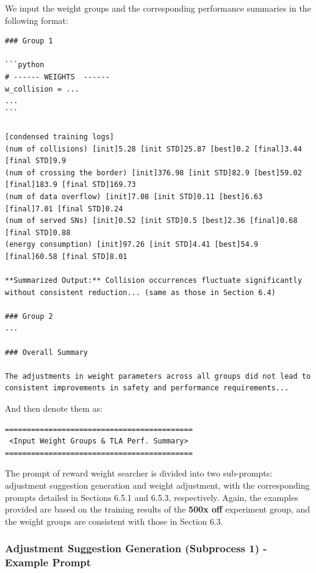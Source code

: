 \documentclass{article}
\begin{document}
We input the weight groups and the corresponding performance summaries in the following format:

\begin{verbatim}
### Group 1

```python
# ------ WEIGHTS  ------
w_collision = ...
...
```

[condensed training logs]
(num of collisions) [init]5.28 [init STD]25.87 [best]0.2 [final]3.44 [final STD]9.9
(num of crossing the border) [init]376.98 [init STD]82.9 [best]59.02 [final]183.9 [final STD]169.73
(num of data overflow) [init]7.08 [init STD]0.11 [best]6.63 [final]7.01 [final STD]0.24
(num of served SNs) [init]0.52 [init STD]0.5 [best]2.36 [final]0.68 [final STD]0.88
(energy consumption) [init]97.26 [init STD]4.41 [best]54.9 [final]60.58 [final STD]8.01

**Summarized Output:** Collision occurrences fluctuate significantly without consistent reduction... (same as those in Section 6.4)

### Group 2
...

### Overall Summary

The adjustments in weight parameters across all groups did not lead to consistent improvements in safety and performance requirements...

\end{verbatim}

And then denote them as:

\begin{verbatim}
===========================================
 <Input Weight Groups & TLA Perf. Summary>
===========================================
\end{verbatim}

The prompt of reward weight searcher is divided into two sub-prompts: adjustment suggestion generation and weight adjustment, with the corresponding prompts detailed in Sections 6.5.1 and 6.5.3, respectively. Again, the examples provided are based on the training results of the \textbf{500x off} experiment group, and the weight groups are consistent with those in Section 6.3.

\subsubsection{Adjustment Suggestion Generation (Subprocess 1) - Example Prompt} 
\end{document}
